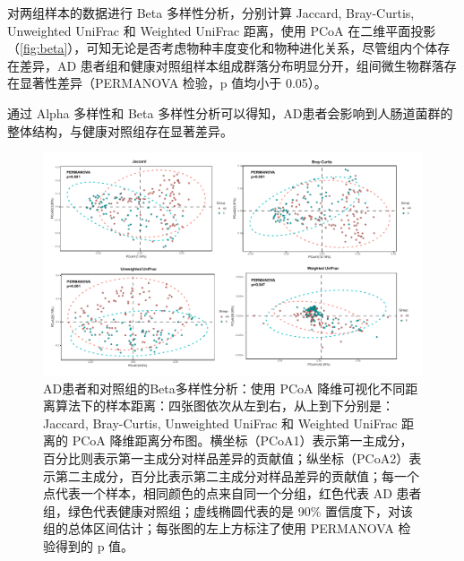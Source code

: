 \documentclass[supercite]{HustGraduPaper}
\begin{document}
对两组样本的数据进行 Beta 多样性分析，分别计算 Jaccard, Bray-Curtis, Unweighted UniFrac 和 Weighted UniFrac 距离，使用 PCoA 在二维平面投影（\autoref{fig:beta}），可知无论是否考虑物种丰度变化和物种进化关系，尽管组内个体存在差异，AD 患者组和健康对照组样本组成群落分布明显分开，组间微生物群落存在显著性差异（PERMANOVA 检验，p 值均小于 0.05）。

通过 Alpha 多样性和 Beta 多样性分析可以得知，AD患者会影响到人肠道菌群的整体结构，与健康对照组存在显著差异。


\begin{figure}[htb]
	\includegraphics[width=\textwidth]{plot/beta.pdf}
	\caption{AD患者和对照组的Beta多样性分析：使用 PCoA 降维可视化不同距离算法下的样本距离：四张图依次从左到右，从上到下分别是：Jaccard, Bray-Curtis, Unweighted UniFrac 和 Weighted UniFrac 距离的 PCoA 降维距离分布图。横坐标（PCoA1）表示第一主成分，百分比则表示第一主成分对样品差异的贡献值；纵坐标（PCoA2）表示第二主成分，百分比表示第二主成分对样品差异的贡献值；每一个点代表一个样本，相同颜色的点来自同一个分组，红色代表 AD 患者组，绿色代表健康对照组；虚线椭圆代表的是 90\% 置信度下，对该组的总体区间估计；每张图的左上方标注了使用 PERMANOVA 检验得到的 p 值。 }
	\label{fig:beta}
\end{figure}
\end{document}
